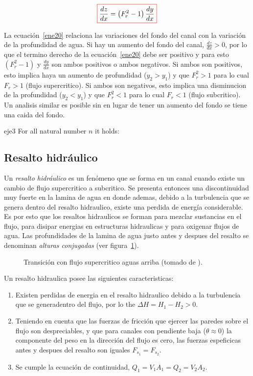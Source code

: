 \documentclass[11pt, oneside]{article}
\begin{document}
\begin{equation}
\color{red}\boxed{\color{black} \frac{dz}{dx} = \left( F_r^2 - 1 \right)\frac{dy}{dx} }
\label{ene20}
\end{equation}

La ecuaci\'on~\ref{ene20} relaciona las variaciones del fondo del canal con la variaci\'on de la profundidad de agua. Si hay un aumento del fondo del canal, $\frac{dz}{dx} > 0$, por lo que el termino derecho de la ecuaci\'on~\ref{ene20} debe ser positivo y para esto $\left( F_r^2 - 1 \right)$ y  $\frac{dy}{dx}$ son ambos positivos o ambos negativos. Si ambos son positivos, esto implica haya un aumento de profundidad ($y_2 > y_1$) y que $F_r^2 > 1$ para lo cual $F_r > 1$ (flujo supercritico). Si ambos son negativos, esto implica una disminucion de la profundidad ($y_2 < y_1$) y que $F_r^2 < 1$ para lo cual $F_r < 1$ (flujo subcritico). Un analisis similar es posible sin en lugar de tener un aumento del fondo se tiene una caida del fondo. 
 
\begin{eje}{}{eje3}
  For all natural number $n$ it holds:
\end{eje}


\subsection{Resalto hidr\'aulico}
Un \emph{resalto hidr\'aulico} es un fen\'omeno que se forma en un canal cuando existe un cambio de flujo supercritico a subcritico. Se presenta entonces una discontinuidad muy fuerte en la lamina de agua en donde ademas, debido a la turbulencia que se genera dentro del resalto hidraulico, existe una perdida de energ\'ia considerable. Es por esto que los resaltos hidraulicos se forman para mezclar sustancias en el flujo, para disipar energias en estructuras hidraulicas y para oxigenar flujos de agua. Las profundidades de la lamina de agua justo antes y despues del resalto se denominan \emph{alturas conjugadas} (ver figura~\ref{fig14}). 

\begin{figure}[h]
\centering
\caption{Transici\'on con flujo supercritico aguas arriba (tomado de \cite{Chau}).}
\label{fig14}
\end{figure}

Un resalto hidraulica posee las siguientes caracteristicas:
\begin{enumerate}
\item Existen perdidas de energia en el resalto hidraulico debido a la turbulencia que se generadentro del flujo, por lo the $\Delta H = H_1 - H_2 > 0$.
\item Teniendo en cuenta que las fuerzas de fricci\'on que ejercer las paredes sobre el flujo son despreciables, y que para canales con pendiente baja ($\theta \approx 0$) la componente del peso en la direcci\'on del flujo es cero, las fuerzas espeficicas antes y despues del resalto son iguales $F_{s_1} = F_{s_2}$. 
\item Se cumple la ecuaci\'on de continuidad, $Q_1 = V_1 A_1 = Q_2 = V_2 A_2$.
\end{enumerate}
\end{document}
